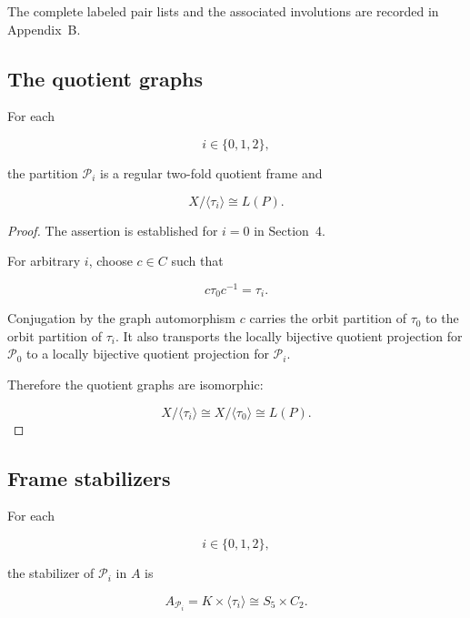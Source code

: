 The complete labeled pair lists and the associated involutions are
recorded in Appendix~B.

\subsection{The quotient graphs}


\begin{proposition}
\label{prop:three-frame-quotients}

For each

\[
i\in\{0,1,2\},
\]

the partition \(\mathcal P_i\) is a regular two-fold quotient frame and

\[
X/\langle\tau_i\rangle
\cong
L(P).
\]

\end{proposition}

\begin{proof}

The assertion is established for \(i=0\) in Section~4.

For arbitrary \(i\), choose \(c\in C\) such that

\[
c\tau_{0}c^{-1}=\tau_i.
\]

Conjugation by the graph automorphism \(c\) carries the orbit partition of
\(\tau_0\) to the orbit partition of \(\tau_i\). It also transports the
locally bijective quotient projection for \(\mathcal P_0\) to a locally
bijective quotient projection for \(\mathcal P_i\).

Therefore the quotient graphs are isomorphic:

\[
X/\langle\tau_i\rangle
\cong
X/\langle\tau_0\rangle
\cong
L(P).
\]
\end{proof}

\subsection{Frame stabilizers}


\begin{proposition}
\label{prop:three-frame-stabilizers}

For each

\[
i\in\{0,1,2\},
\]

the stabilizer of \(\mathcal P_i\) in \(A\) is

\[
A_{\mathcal P_i}
=
K\times\langle\tau_i\rangle
\cong
S_{5}\times C_{2}.
\]

\end{proposition}

